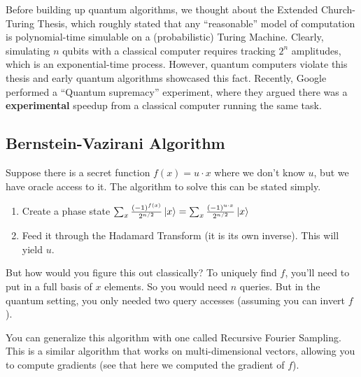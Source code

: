 Before building up quantum algorithms, we thought about the Extended Church-Turing Thesis, which roughly stated that any ``reasonable'' model of computation is
polynomial-time simulable on a (probabilistic) Turing Machine. Clearly, simulating $n$ qubits with a classical computer requires tracking $2^n$ amplitudes,
which is an exponential-time process. However, quantum computers violate this thesis and early quantum algorithms showcased this fact. Recently,
Google performed a ``Quantum supremacy'' experiment, where they argued there was a \textbf{experimental} speedup from a classical computer running the same task.

\subsection{Bernstein-Vazirani Algorithm}
Suppose there is a secret function $f(x) = u \cdot x$ where we don't know $u$,
but we have oracle access to it. The algorithm to solve this can be stated simply.

\begin{enumerate}
    \item Create a phase state $\sum_x \frac{(-1)^{f(x)}}{2^{n/2}} \ket{x} = \sum_x \frac{(-1)^{u \cdot x}}{2^{n/2}} \ket{x}$
    \item Feed it through the Hadamard Transform (it is its own inverse). This will yield $u$.
\end{enumerate}

But how would you figure this out classically? To uniquely find $f$, you'll need to put in a full basis of $x$ elements.
So you would need $n$ queries. But in the quantum setting, you only needed two query accesses (assuming you can invert $f$).

You can generalize this algorithm with one called Recursive Fourier Sampling. This is a similar algorithm that works on
multi-dimensional vectors, allowing you to compute gradients (see that here we computed the gradient of $f$).

